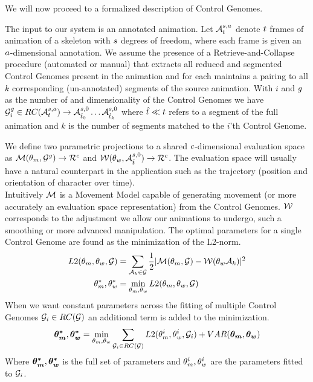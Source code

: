 We will now proceed to a formalized description of Control Genomes.

The input to our system is an annotated animation. Let $\mathcal{A}^{s,a}_t$ denote $t$ frames of animation of a skeleton with $s$ degrees of freedom, where each frame is given an $a$-dimensional annotation. We assume the presence of a Retrieve-and-Collapse procedure (automated or manual) that extracts all reduced and segmented Control Genomes present in the animation and for each maintains a pairing to all $k$ corresponding (un-annotated) segments of the source animation. With $i$ and $g$ as the number of and dimensionality of the Control Genomes we have $\mathcal{G}^g_i\in{RC}(\mathcal{A}^{s,a}_t)\rightarrow\mathcal{A}^{s,0}_{{\hat{t}}_0}\ldots\mathcal{A}^{s,0}_{{\hat{t}}_k}$ where ${\hat{t}}\ll t$ refers to a segment of the full animation and $k$ is the number of segments matched to the $i$'th Control Genome.


We define two parametric projections to a shared $c$-dimensional evaluation space as $\mathcal{M}(\theta_{m},\mathcal{G}^{g}) \rightarrow \mathcal{R}^{c}$ and $\mathcal{W}(\theta_{w},\mathcal{A}_{{\hat{t}}}^{s,0}) \rightarrow \mathcal{R}^{c}$. The evaluation space will usually have a natural counterpart in the application such as the trajectory (position and orientation of character over time).\\
Intuitively $\mathcal{M}$ is a Movement Model capable of generating movement (or more accurately an evaluation space representation) from the Control Genomes. $\mathcal{W}$ corresponds to the adjustment we allow our animations to undergo, such a smoothing or more advanced manipulation. The optimal parameters for a single Control Genome are found as the minimization of the L2-norm.
\begin{subequations}
\begin{align}
    {L2}(\theta_{m},\theta_{w},\mathcal{G})&=\sum_{\mathcal{A}_k\in\mathcal{G}}{\frac{1}{2}|\mathcal{M}(\theta_{m},\mathcal{G})-\mathcal{W}(\theta_{w}\mathcal{A}_k)|^2}\\
    \theta_{m}^*,\theta_{w}^*&=\min_{\theta_{m},\theta_{w}}{{L2}(\theta_{m},\theta_{w},\mathcal{G})}
\end{align}
\end{subequations}
When we want constant parameters across the fitting of multiple Control Genomes $\mathcal{G}_i\in{RC}(\mathcal{G})$ an additional term is added to the minimization. 
\begin{equation}
    \boldsymbol{\theta_{m}^* },\boldsymbol{\theta_{w}^* }=\min_{\theta_{m},\theta_{w}}{\sum_{\mathcal{G}_i\in{RC}(\mathcal{G})}{{L2}(\theta_{m}^i,\theta_{w}^i,\mathcal{G}_i)}}+VAR(\boldsymbol{\theta_{m} },\boldsymbol{\theta_{w} })
\end{equation}
Where $\boldsymbol{\theta_{m}^* },\boldsymbol{\theta_{w}^* }$ is the full set of parameters and $\theta_{m}^i,\theta_{w}^i$ are the parameters fitted to $\mathcal{G}_i$.

